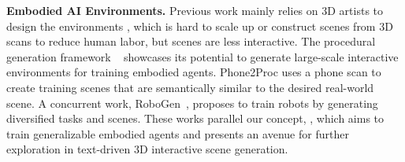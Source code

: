 \medbreak
\noindent \textbf{Embodied AI Environments.} Previous work mainly relies on 3D artists to design the environments \cite{ai2thor, li2023behavior, puig2018virtualhome, xia2018gibson, deitke2020robothor, gan2020threedworld, khanna2023hssd}, which is hard to scale up or construct scenes from 3D scans \cite{savva2019habitat, szot2021habitat, ramakrishnan2021hm3d} to reduce human labor, but scenes are less interactive.
The procedural generation framework \procthor~\cite{procthor} showcases its potential to generate large-scale interactive environments for training embodied agents. Phone2Proc \cite{phone2proc} uses a phone scan to create training scenes that are semantically similar to the desired real-world scene. A concurrent work, RoboGen~\cite{wang2023robogen}, proposes to train robots by generating diversified tasks and scenes. These works parallel our concept, \holodeck, which aims to train generalizable embodied agents and presents an avenue for further exploration in text-driven 3D interactive scene generation.

